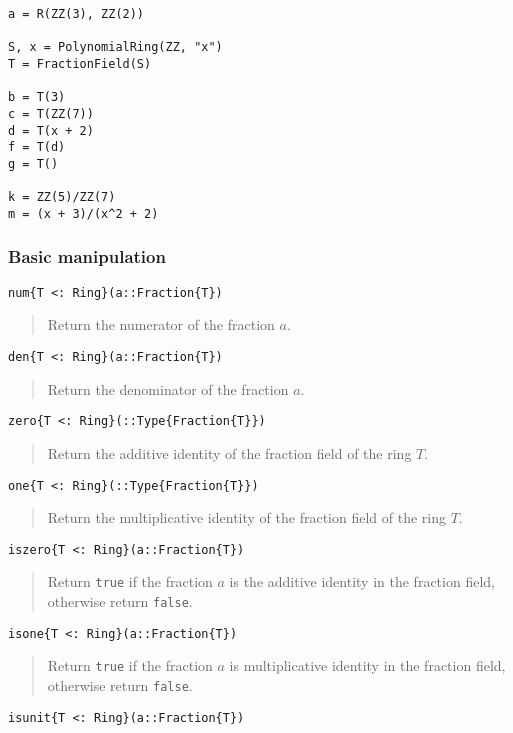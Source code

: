 \documentclass[a4paper,10pt]{article}
\newcommand{\code}{\lstinline}
\newcommand{\desc}[1]{\vspace{-3mm}\begin{quote}#1\end{quote}}
\begin{document}
{{\begin{lstlisting}
a = R(ZZ(3), ZZ(2))

S, x = PolynomialRing(ZZ, "x")
T = FractionField(S)

b = T(3)
c = T(ZZ(7))
d = T(x + 2)
f = T(d)
g = T()

k = ZZ(5)/ZZ(7)
m = (x + 3)/(x^2 + 2)
\end{lstlisting}

\subsubsection{Basic manipulation}

\begin{lstlisting}
num{T <: Ring}(a::Fraction{T})
\end{lstlisting}

\desc{Return the numerator of the fraction $a$.}

\begin{lstlisting}
den{T <: Ring}(a::Fraction{T})
\end{lstlisting}

\desc{Return the denominator of the fraction $a$.}

\begin{lstlisting}
zero{T <: Ring}(::Type{Fraction{T}})
\end{lstlisting}

\desc{Return the additive identity of the fraction field of the ring $T$.}

\begin{lstlisting}
one{T <: Ring}(::Type{Fraction{T}})
\end{lstlisting}

\desc{Return the multiplicative identity of the fraction field of the ring 
$T$.}

\begin{lstlisting}
iszero{T <: Ring}(a::Fraction{T})
\end{lstlisting}

\desc{Return \code{true} if the fraction $a$ is the additive identity in the
fraction field, otherwise return \code{false}.}

\begin{lstlisting}
isone{T <: Ring}(a::Fraction{T})
\end{lstlisting}

\desc{Return \code{true} if the fraction $a$ is multiplicative identity in the
fraction field, otherwise return \code{false}.}

\begin{lstlisting}
isunit{T <: Ring}(a::Fraction{T})
\end{lstlisting}

}}
\end{document}
